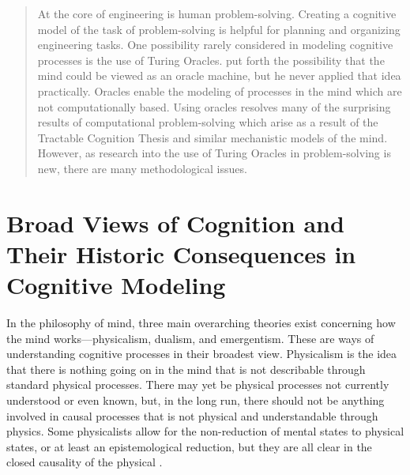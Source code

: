 
\begin{abstract}
At the core of engineering is human problem-solving.  Creating a cognitive model of the task of problem-solving is helpful for planning and organizing engineering tasks.  One possibility rarely considered in modeling cognitive processes is the use of Turing Oracles.  \citet{copeland1998} put forth the possibility that the mind could be viewed as an oracle machine, but he never applied that idea practically.  Oracles enable the modeling of processes in the mind which are not computationally based.  Using oracles resolves many of the surprising results of computational problem-solving which arise as a result of the Tractable Cognition Thesis and similar mechanistic models of the mind.  However, as research into the use of Turing Oracles in problem-solving is new, there are many methodological issues.
\end{abstract}

\section{Broad Views of Cognition and Their Historic Consequences in Cognitive Modeling}

In the philosophy of mind, three main overarching theories exist concerning how the mind works---physicalism, dualism, and emergentism.  These are ways of understanding cognitive processes in their broadest view.  Physicalism is the idea that there is nothing going on in the mind that is not describable through standard physical processes.  There may yet be physical processes not currently understood or even known, but, in the long run, there should not be anything involved in causal processes that is not physical and understandable through physics.  Some physicalists allow for the non-reduction of mental states to physical states, or at least an epistemological reduction, but they are all clear in the closed causality of the physical \citep{horgan1994}.

